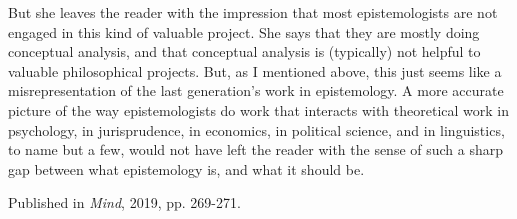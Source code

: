 \documentclass[
  11pt,
  letterpaper,
  DIV=11,
  numbers=noendperiod,
  twoside]{scrartcl}
\begin{document}
But she leaves the reader with the impression that most epistemologists
are not engaged in this kind of valuable project. She says that they are
mostly doing conceptual analysis, and that conceptual analysis is
(typically) not helpful to valuable philosophical projects. But, as I
mentioned above, this just seems like a misrepresentation of the last
generation's work in epistemology. A more accurate picture of the way
epistemologists do work that interacts with theoretical work in
psychology, in jurisprudence, in economics, in political science, and in
linguistics, to name but a few, would not have left the reader with the
sense of such a sharp gap between what epistemology is, and what it
should be.



\noindent Published in\emph{
Mind}, 2019, pp. 269-271.
\end{document}
